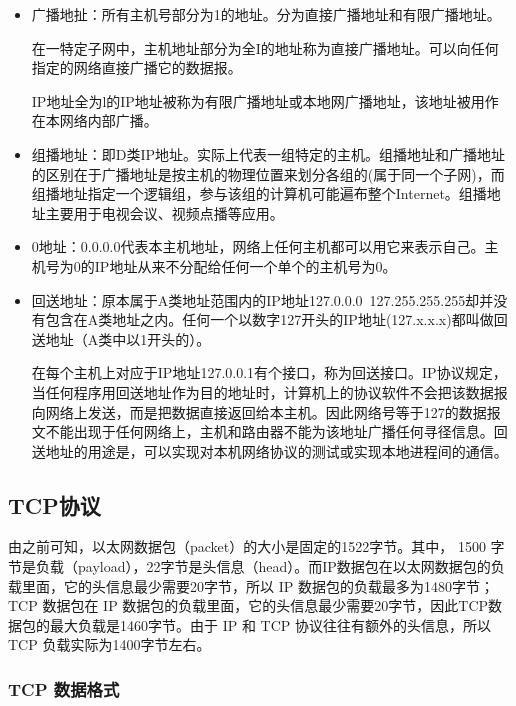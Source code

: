 \documentclass[UTF8]{article}%
\begin{document}
\begin{itemize}
    \item 广播地扯：所有主机号部分为1的地址。分为直接广播地址和有限广播地址。

    在一特定子网中，主机地址部分为全I的地址称为直接广播地址。可以向任何指定的网络直接广播它的数据报。

    IP地址全为l的IP地址被称为有限广播地址或本地网广播地址，该地址被用作在本网络内部广播。

    \item 组播地址：即D类IP地址。实际上代表一组特定的主机。组播地址和广播地址的区别在于广播地址是按主机的物理位置来划分各组的(属于同一个子网)，而组播地址指定一个逻辑组，参与该组的计算机可能遍布整个Internet。组播地址主要用于电视会议、视频点播等应用。
    \item 0地址：0.0.0.0代表本主机地址，网络上任何主机都可以用它来表示自己。主机号为0的IP地址从来不分配给任何一个单个的主机号为0。
    \item 回送地址：原本属于A类地址范围内的IP地址127.0.0.0~127.255.255.255却并没有包含在A类地址之内。任何一个以数字127开头的IP地址(127.x.x.x)都叫做回送地址（A类中以1开头的）。
    
    在每个主机上对应于IP地址127.0.0.1有个接口，称为回送接口。IP协议规定，当任何程序用回送地址作为目的地址时，计算机上的协议软件不会把该数据报向网络上发送，而是把数据直接返回给本主机。因此网络号等于127的数据报文不能出现于任何网络上，主机和路由器不能为该地址广播任何寻径信息。回送地址的用途是，可以实现对本机网络协议的测试或实现本地进程间的通信。
\end{itemize}

\subsection{TCP协议}

由之前可知，以太网数据包（packet）的大小是固定的1522字节。其中， 1500 字节是负载（payload），22字节是头信息（head）。而IP数据包在以太网数据包的负载里面，它的头信息最少需要20字节，所以 IP 数据包的负载最多为1480字节；TCP 数据包在 IP 数据包的负载里面，它的头信息最少需要20字节，因此TCP数据包的最大负载是1460字节。由于 IP 和 TCP 协议往往有额外的头信息，所以 TCP 负载实际为1400字节左右。

\subsubsection{TCP 数据格式}
\end{document}
